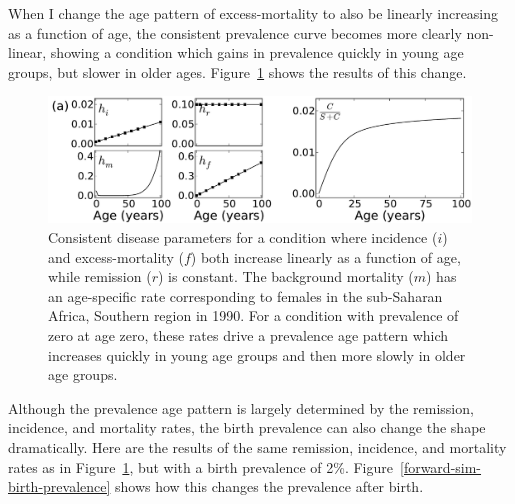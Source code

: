 When I change the age pattern of excess-mortality to also be linearly
increasing as a function of age, the consistent prevalence curve
becomes more clearly non-linear, showing a condition which gains in
prevalence quickly in young age groups, but slower in older
ages. Figure~\ref{forward-sim-more-excess-mortality} shows the results
of this change.

\begin{figure}[h]
\begin{center}
\includegraphics[width=\textwidth]{more-excess-mortality.pdf}

\caption{Consistent disease parameters for a condition where incidence
  ($i$) and excess-mortality ($f$) both increase linearly as a
  function of age, while remission ($r$) is constant. The background
  mortality ($m$) has an age-specific rate corresponding to females in
  the sub-Saharan Africa, Southern region in 1990. For a condition
  with prevalence of zero at age zero, these rates drive a prevalence
  age pattern which increases quickly in young age groups and then
  more slowly in older age groups.}
\label{forward-sim-more-excess-mortality}
\end{center}
\end{figure}


Although the prevalence age pattern is largely determined by the
remission, incidence, and mortality rates, the birth prevalence can
also change the shape dramatically.  Here are the results of the same
remission, incidence, and mortality rates as in
Figure~\ref{forward-sim-more-excess-mortality}, but with a birth
prevalence of 2\%.  Figure~\ref{forward-sim-birth-prevalence} shows
how this changes the prevalence after birth.

